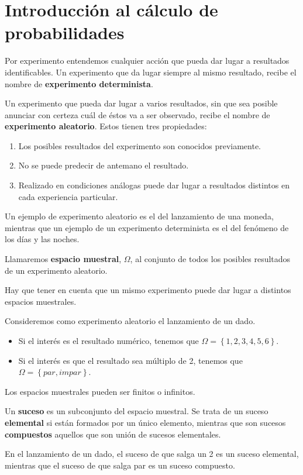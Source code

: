 \chapter{Introducción al cálculo de probabilidades}
Por experimento entendemos cualquier acción que pueda dar lugar a resultados identificables. Un experimento que da lugar siempre al mismo resultado, recibe el nombre de \textbf{experimento determinista}.
\begin{definition}
Un experimento que pueda dar lugar a varios resultados, sin que sea posible anunciar con certeza cuál de éstos va a ser observado, recibe el nombre de \textbf{experimento aleatorio}. Estos tienen tres propiedades:
\begin{enumerate}
\item Los posibles resultados del experimento son conocidos previamente.
\item No se puede predecir de antemano el resultado.
\item Realizado en condiciones análogas puede dar lugar a resultados distintos en cada experiencia particular.
\end{enumerate}	
\end{definition}
\begin{eg}
Un ejemplo de experimento aleatorio es el del lanzamiento de una moneda, mientras que un ejemplo de un experimento determinista es el del fenómeno de los días y las noches.
\end{eg}
\begin{definition}
Llamaremos \textbf{espacio muestral}, $\displaystyle \Omega  $, al conjunto de todos los posibles resultados de un experimento aleatorio.
\end{definition}
\begin{observation}
Hay que tener en cuenta que un mismo experimento puede dar lugar a distintos espacios muestrales.
\end{observation}
\begin{eg}
Consideremos como experimento aleatorio el lanzamiento de un dado.
\begin{itemize}
	\item Si el interés es el resultado numérico, tenemos que $\displaystyle \Omega = \left\{ 1, 2, 3, 4, 5, 6\right\}  $.
	\item Si el interés es que el resultado sea múltiplo de 2, tenemos que $\displaystyle \Omega = \left\{ par, impar\right\}  $.
\end{itemize}
\end{eg}
\begin{observation}
Los espacios muestrales pueden ser finitos o infinitos.
\end{observation}
\begin{definition}[Suceso]
Un \textbf{suceso} es un subconjunto del espacio muestral. Se trata de un suceso \textbf{elemental} si están formados por un único elemento, mientras que son sucesos \textbf{compuestos} aquellos que son unión de sucesos elementales. 
\end{definition}
\begin{eg}
En el lanzamiento de un dado, el suceso de que salga un 2 es un suceso elemental, mientras que el suceso de que salga par es un suceso compuesto.
\end{eg}
